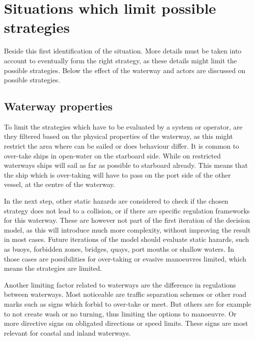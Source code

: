 \clearpage


\section{Situations which limit possible strategies}
Beside this first identification of the situation. More details must be taken into account to eventually form the right strategy, as these details might limit the possible strategies. Below the effect of the waterway and actors are discussed on possible strategies.

\subsection{Waterway properties}
To limit the strategies which have to be evaluated by a system or operator, are they filtered based on the physical properties of the waterway, as this might restrict the area where can be sailed or does behaviour differ. It is common to over-take ships in open-water on the starboard side. While on restricted waterways ships will sail as far as possible to starboard already. This means that the ship which is over-taking will have to pass on the port side of the other vessel, at the centre of the waterway.

In the next step, other static hazards are considered to check if the chosen strategy does not lead to a collision, or if there are specific regulation frameworks for this waterway. These are however not part of the first iteration of the decision model, as this will introduce much more complexity, without improving the result in most cases. Future iterations of the model should evaluate static hazards, such as buoys, forbidden zones, bridges, quays, port mouths or shallow waters. In those cases are possibilities for over-taking or evasive manoeuvres limited, which means the strategies are limited.

Another limiting factor related to waterways are the difference in regulations between waterways. Most noticeable are traffic separation schemes or other road marks such as signs which forbid to over-take or meet. But others are for example to not create wash or no turning, thus limiting the options to manoeuvre. Or more directive signs on obligated directions or speed limits. These signs are most relevant for coastal and inland waterways.


